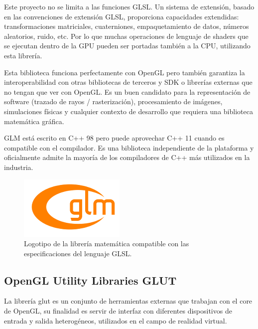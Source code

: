 \documentclass[a4paper, 17pt]{book}
\begin{document}
\vspace{1mm} %

Este proyecto no se limita a las funciones GLSL. Un sistema de extensión, basado en las convenciones
de extensión GLSL, proporciona capacidades extendidas: transformaciones matriciales, cuaterniones,
empaquetamiento de datos, números aleatorios, ruido, etc. Por lo que muchas operaciones de lenguaje
de shaders que se ejecutan dentro de la GPU pueden ser portadas también a la CPU, utilizando esta librería.

\vspace{1mm} %

Esta biblioteca funciona perfectamente con OpenGL pero también garantiza la interoperabilidad con otras
bibliotecas de terceros y SDK o librerías externas que no tengan que ver con OpenGL. Es un buen candidato
para la representación de software (trazado de rayos / rasterización), procesamiento de imágenes,
simulaciones físicas y cualquier contexto de desarrollo que requiera una biblioteca matemática gráfica.

\vspace{1mm} %

GLM está escrito en C++ 98 pero puede aprovechar C++ 11 cuando es compatible con el compilador. Es una
biblioteca independiente de la plataforma y oficialmente admite la mayoría de los compiladores de C++
más utilizados en la industria.

\begin{figure}[H]
    \centering
    \includegraphics[scale=0.80, keepaspectratio]{img/logo_glm.png}
    \caption{Logotipo de la librería matemática compatible con las especificaciones del lenguaje GLSL.}
    \label{figura:logo_glm}
\end{figure}

\subsection{OpenGL Utility Libraries GLUT} 
\label{subsec:GLUT}


La librería glut es un conjunto de herramientas externas que trabajan con el core de OpenGL,
su finalidad es servir de interfaz con diferentes dispositivos de entrada y salida heterogéneos,
utilizados en el campo de realidad virtual.
\end{document}
